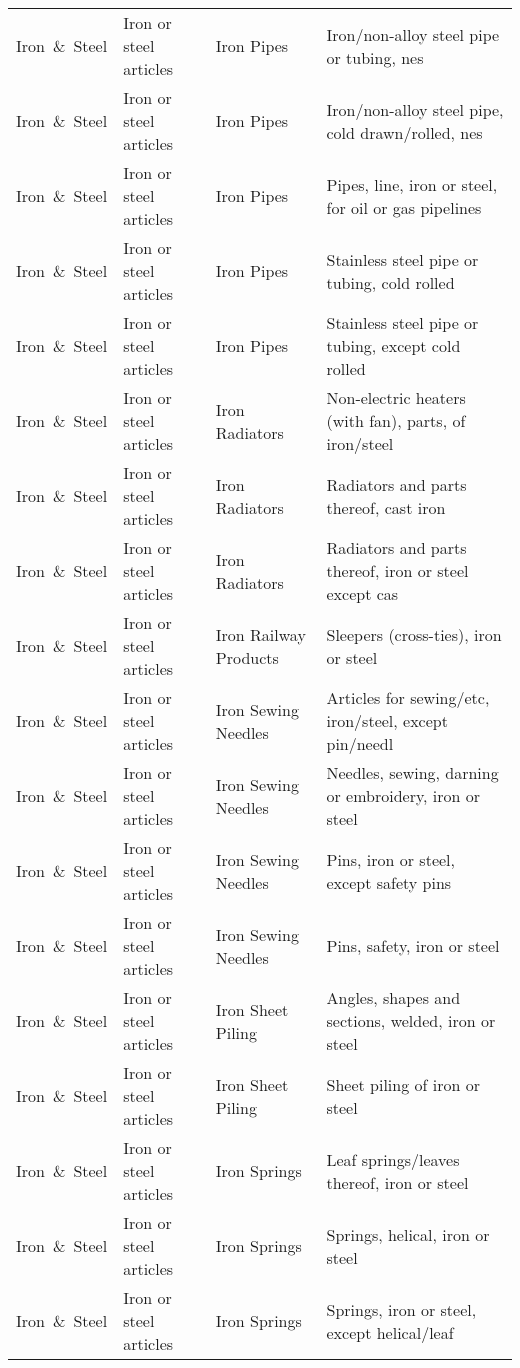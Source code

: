 \begin{appendices}
\begin{xltabular}{\textwidth}{|p{0.07\textwidth}|p{0.12\textwidth}|p{0.20\textwidth}|p{0.5\textwidth}|}
Iron\ \&\ Steel & Iron or steel articles & Iron Pipes & Iron/non-alloy steel pipe or tubing, nes \\
Iron\ \&\ Steel & Iron or steel articles & Iron Pipes & Iron/non-alloy steel pipe, cold drawn/rolled, nes \\
Iron\ \&\ Steel & Iron or steel articles & Iron Pipes & Pipes, line, iron or steel, for oil or gas pipelines \\
Iron\ \&\ Steel & Iron or steel articles & Iron Pipes & Stainless steel pipe or tubing, cold rolled \\
Iron\ \&\ Steel & Iron or steel articles & Iron Pipes & Stainless steel pipe or tubing, except cold rolled \\
Iron\ \&\ Steel & Iron or steel articles & Iron Radiators & Non-electric heaters (with fan), parts, of iron/steel \\
Iron\ \&\ Steel & Iron or steel articles & Iron Radiators & Radiators and parts thereof, cast iron \\
Iron\ \&\ Steel & Iron or steel articles & Iron Radiators & Radiators and parts thereof, iron or steel except cas \\
Iron\ \&\ Steel & Iron or steel articles & Iron Railway Products & Sleepers (cross-ties), iron or steel \\
Iron\ \&\ Steel & Iron or steel articles & Iron Sewing Needles & Articles for sewing/etc, iron/steel, except pin/needl \\
Iron\ \&\ Steel & Iron or steel articles & Iron Sewing Needles & Needles, sewing, darning or embroidery, iron or steel \\
Iron\ \&\ Steel & Iron or steel articles & Iron Sewing Needles & Pins, iron or steel, except safety pins \\
Iron\ \&\ Steel & Iron or steel articles & Iron Sewing Needles & Pins, safety, iron or steel \\
Iron\ \&\ Steel & Iron or steel articles & Iron Sheet Piling & Angles, shapes and sections, welded, iron or steel \\
Iron\ \&\ Steel & Iron or steel articles & Iron Sheet Piling & Sheet piling of iron or steel \\
Iron\ \&\ Steel & Iron or steel articles & Iron Springs & Leaf springs/leaves thereof, iron or steel \\
Iron\ \&\ Steel & Iron or steel articles & Iron Springs & Springs, helical, iron or steel \\
Iron\ \&\ Steel & Iron or steel articles & Iron Springs & Springs, iron or steel, except helical/leaf \\

\end{xltabular}
\end{appendices}
